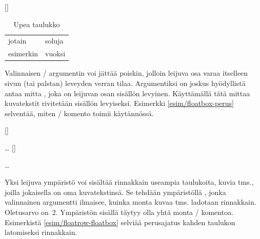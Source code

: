 \begin{esimerkki*}

\begin{koodilohko}
\begin{table}
  [\FBwidth]{
    \caption{Upea taulukko}    %
    \label{tlk/upea-taulukko}  %
  }{
    \begin{tabular}{ll}
      jotain & soluja \\
      esimerkin & vuoksi \\
    \end{tabular}
  }
\end{table}
\end{koodilohko}
  \caption{\-/ komennon peruskäyttö}
  \label{esim/floatbox-perus}
\end{esimerkki*}

\noindent
Valinnaisen \-/ argumentin voi jättää poiskin, jolloin
leijuva osa varaa itselleen sivun (tai palstan) leveyden verran tilaa.
Argumentiksi on joskus hyödyllistä antaa mitta , joka on
leijuvan osan sisällön levyinen. Käyttämällä tätä mittaa kuvatekstit
rivitetään sisällön levyiseksi. Esimerkki \ref{esim/floatbox-perus}
selventää, miten \-/ komento toimii käytännössä.

\begin{esimerkki*}

\begin{koodilohko}
\begin{table}
  \begin{floatrow}[2]  %
    [\FBwidth]{\caption{Vasen}}{…}
    [\FBwidth]{\caption{Oikea}}{…}
  \end{floatrow}
\end{table}
\end{koodilohko}
  \caption{Rinnakkaisten leijuvien osien toteutus
    \-/ ympäristön ja \-/ komennon
    avulla. Kohdassa ''\koodi{\ldots}'' olisi varsinainen sisältö eli
    taulukon toteutus}
  \label{esim/floatrow-floatbox}
\end{esimerkki*}

Yksi leijuva ympäristö voi sisältää rinnakkain useampia taulukoita,
kuvia tms., joilla jokaisella on oma kuvatekstinsä. Se tehdään
ympäristöllä , jonka valinnainen argumentti
ilmaisee, kuinka monta kuvaa tms. ladotaan rinnakkain. Oletusarvo on~2.
Ympäristön sisällä täytyy olla yhtä monta \-/
komentoa. Esimerkistä \ref{esim/floatrow-floatbox} selviää perusajatus
kahden taulukon latomiseksi rinnakkain.

